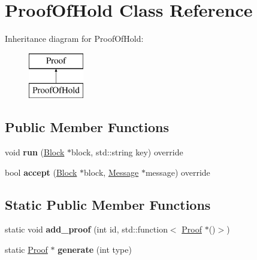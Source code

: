 \hypertarget{classProofOfHold}{}\section{Proof\+Of\+Hold Class Reference}
\label{classProofOfHold}
Inheritance diagram for Proof\+Of\+Hold\+:\begin{figure}[H]
\begin{center}
\leavevmode
\includegraphics[height=2.000000cm]{classProofOfHold}
\end{center}
\end{figure}
\subsection*{Public Member Functions}
\begin{DoxyCompactItemize}
\item 
\mbox{\label{classProofOfHold_a56f59ff740518726db1667b39ae9451e}} 
void {\bfseries run} (\mbox{\hyperlink{classBlock}{Block}} $\ast$block, std\+::string key) override
\item 
\mbox{\label{classProofOfHold_a2ca4ea3c1791c24d75e466ed0a9b6aaa}} 
bool {\bfseries accept} (\mbox{\hyperlink{classBlock}{Block}} $\ast$block, \mbox{\hyperlink{classMessage}{Message}} $\ast$message) override
\end{DoxyCompactItemize}
\subsection*{Static Public Member Functions}
\begin{DoxyCompactItemize}
\item 
\mbox{\label{classProof_a93208e5161d25f8533849ac2dac8d6b8}} 
static void {\bfseries add\+\_\+proof} (int id, std\+::function$<$ \mbox{\hyperlink{classProof}{Proof}} $\ast$()$>$)
\item 
\mbox{\label{classProof_a267f0f4587babb59884b5f280e2d54c8}} 
static \mbox{\hyperlink{classProof}{Proof}} $\ast$ {\bfseries generate} (int type)
\end{DoxyCompactItemize}
